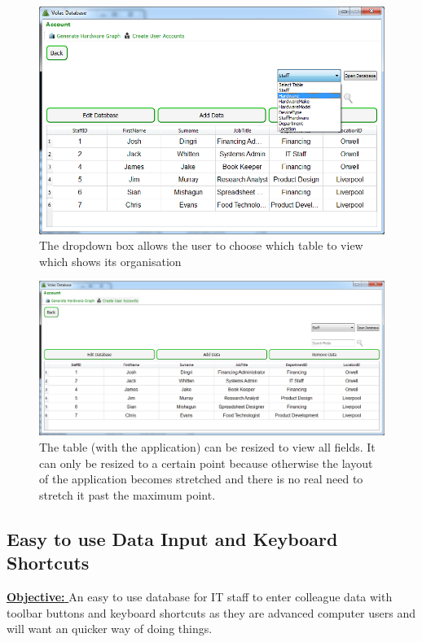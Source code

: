 \begin{figure}[H]
    \includegraphics[width=\textwidth]{./Evaluation/Images/cleardb2.png}
    \caption{The dropdown box allows the user to choose which table to view which shows its organisation} 
\end{figure}

\begin{figure}[H]
    \includegraphics[width=\textwidth]{./Evaluation/Images/cleardb3.png}
    \caption{The table (with the application) can be resized to view all fields. It can only be resized to a certain point because otherwise the layout of the application becomes stretched and there is no real need to stretch it past the maximum point.} 
\end{figure}


\subsection{Easy to use Data Input and Keyboard Shortcuts}

\underline{\textbf{Objective:} }  An easy to use database for IT staff to enter colleague data with toolbar buttons and keyboard shortcuts as they are advanced computer users and will want an quicker way of doing things.

